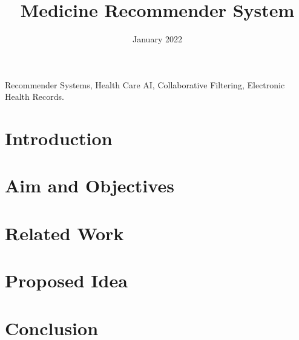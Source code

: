 \documentclass[conference]{IEEEtran}
\begin{document}
\title{Medicine Recommender System}

\author{
	\date{January 2022}
}

\maketitle

\begin{abstract}
    
\end{abstract}

\begin{IEEEkeywords}
    Recommender Systems, Health Care AI, Collaborative Filtering,
    Electronic Health Records.
\end{IEEEkeywords}

\section{Introduction}
    

\section{Aim and Objectives}
    


\section{Related Work}
    

\section{Proposed Idea}
    

\section{Conclusion}

    \pagebreak
    \pagebreak
    \pagebreak



\end{document}
